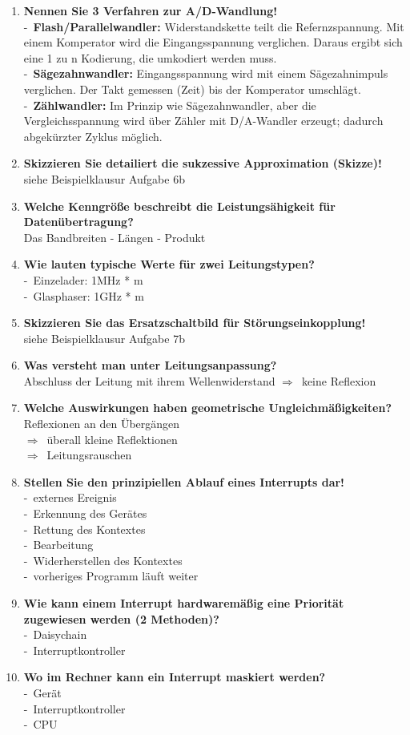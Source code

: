 \documentclass[a4paper,12pt]{article}
\newcommand{\questionnopage}[2]{\pagebreak[3]\item {\textbf{#1?}}#2}
\newcommand{\statementnopage}[2]{\pagebreak[3]\item {\textbf{#1!}}#2}
\newcommand{\catchword}[1]{\\-\ #1}
\newcommand{\normaltext}[1]{\\#1}
\newcommand{\result}[1]{\\$\Rightarrow$\ #1}
\newcommand{\resultol}[1]{$\Rightarrow$\ #1}
\newcommand{\important}[1]{\textbf{#1}}
\begin{document}
\begin{enumerate}
  \statementnopage{Nennen Sie 3 Verfahren zur A/D-Wandlung}
  {
    \catchword{\important{Flash/Parallelwandler:} Widerstandskette teilt die Refernzspannung. 
    Mit einem Komperator wird die Eingangsspannung verglichen. Daraus ergibt sich eine 1 zu n
    Kodierung, die umkodiert werden muss.}
    \catchword{\important{Sägezahnwandler:} Eingangsspannung wird mit einem Sägezahnimpuls 
    verglichen. Der Takt gemessen (Zeit) bis der Komperator umschlägt.}
    \catchword{\important{Zählwandler:} Im Prinzip wie Sägezahnwandler, aber die 
    Vergleichsspannung wird über Zähler mit D/A-Wandler erzeugt; dadurch abgekürzter Zyklus möglich.}
  }
  
  \statementnopage{Skizzieren Sie detailiert die sukzessive Approximation (Skizze)}
  {
  \normaltext{siehe Beispielklausur Aufgabe 6b}
  }

  \questionnopage{Welche Kenngröße beschreibt die Leistungsähigkeit für Datenübertragung}
  {
    \normaltext{Das Bandbreiten - Längen - Produkt}
  }

  \questionnopage{Wie lauten typische Werte für zwei Leitungstypen}
  {
    \catchword{Einzelader: 1MHz * m}
    \catchword{Glasphaser: 1GHz * m}
  }
  
  \statementnopage{Skizzieren Sie das Ersatzschaltbild für Störungseinkopplung}
  {
  \normaltext{siehe Beispielklausur Aufgabe 7b}
  }

  \questionnopage{Was versteht man unter Leitungsanpassung}
  {
    \normaltext{Abschluss der Leitung mit ihrem Wellenwiderstand \resultol{keine Reflexion}}
  }
  
  \questionnopage{Welche Auswirkungen haben geometrische Ungleichmäßigkeiten}
  {
    \normaltext{Reflexionen an den Übergängen\result{überall kleine Reflektionen}
    \result{Leitungsrauschen}}
  }
  
  \statementnopage{Stellen Sie den prinzipiellen Ablauf eines Interrupts dar}
  {
    \catchword{externes Ereignis}
    \catchword{Erkennung des Gerätes}
    \catchword{Rettung des Kontextes}
    \catchword{Bearbeitung}
    \catchword{Widerherstellen des Kontextes}
    \catchword{vorheriges Programm läuft weiter}
  }
  
  \questionnopage{Wie kann einem Interrupt hardwaremäßig eine Priorität zugewiesen werden 
  (2 Methoden)}
  {
    \catchword{Daisychain}
    \catchword{Interruptkontroller}
  }
  
  \questionnopage{Wo im Rechner kann ein Interrupt maskiert werden}
  {
    \catchword{Gerät}
    \catchword{Interruptkontroller}
    \catchword{CPU}
  }
  

\end{enumerate}
\end{document}

